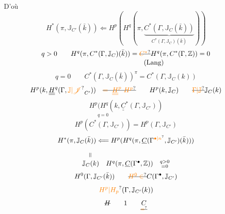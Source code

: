 D'où
\[
H^*(\pi,\mathbb{J}_{C'}(\bar{k}))\Longleftarrow H^p\left(H^q\left(\pi,\underbrace{C^*\left(\Gamma,\mathbb{J}_C(\bar{k})\right)}_{C^*(\Gamma,\mathbb{J}_C)(\bar{k})}\right)\right)
\]
\[
\begin{aligned}
q>0\qquad H^q(\pi,C^*(\Gamma,\mathbb{J}_C)(\bar{k}))
&=\deleted{{\unsure{C^*}}}H^q(\pi,C^*(\Gamma,\mathbb{Z}))=0\\[-2pt]
&\qquad\text{(Lang)}
\end{aligned}
\]
\[
q=0\qquad C^*(\Gamma,\mathbb{J}_C(\bar{k}))^\pi=C^*(\Gamma,\mathbb{J}_C(k))
\]
\[
H^p(k,\underline{\underline{H}}^q(\Gamma,{\unsure{\mathbb{J}|\mathscr{J}}}_{C'}))
\quad\deleted{{\unsure{=\ \underline{\underline{H}}^p\ H^p}}}\qquad H^p(k,\mathbb{J}_C)\qquad\deleted{{\unsure{\Gamma|\mathbb{J}}}}\mathbb{J}_C(k)
\]
\[
H^p(H^q(k,\underline{\underline{C}}^*(\Gamma,\mathbb{J}_{C'}))
\]
\[
\overset{q=0}{H^p(C^*(\Gamma,\mathbb{J}_{C'}))}=H^p(\Gamma,\mathbb{J}_{C'})
\]
\[
H^*(\pi,\mathbb{J}_C(\bar{k}))\Longleftarrow H^p(H^q(\pi,\underline{C}(\Gamma^{{\unsure{\bullet|n}}},\mathbb{J}_{C'})(\bar{k})))
\]
\[
\begin{array}{cc}
{\tikz[baseline=-.5ex]{\node[rotate=90] {$=$};}}&\\
\mathbb{J}_C(k)&H^q(\pi,\underline{C}(\Gamma^{\bullet},\mathbb{Z}))\quad\substack{q>0\\=0}
\end{array}
\]
\[
H^0(\Gamma,\mathbb{J}_{C'}(\bar{k}))\qquad\deleted{{\unsure{H^0\in}}}C(\Gamma^{\bullet},\mathbb{J}_{C'})
\]
\[
\hfill{\unsure{H^p|H_p}}(\Gamma,\mathbb{J}_{C'}(k))
\]
\[
\deleted{H}\qquad 1\qquad\underset{\deleted{{\unsure{=}}}}{C}
\]
